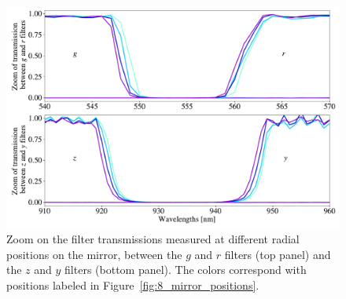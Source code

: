 \begin{figure}
    \centering
    \includegraphics[width=1\columnwidth]{fig/blue_shift_filter_edges.pdf}
    \caption{Zoom on the \SD filter transmissions measured at different radial positions on the mirror, between the $g$ and $r$ filters (top panel) and the $z$ and $y$ filters (bottom panel). The colors correspond with positions labeled in Figure~\ref{fig:8_mirror_positions}.}
    \label{fig:blueshift}
\end{figure}

%
%









